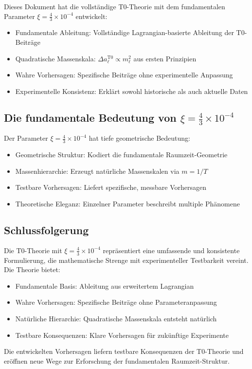\documentclass[12pt,a4paper]{article}
\begin{document}
	\begin{keyresult}
		Dieses Dokument hat die vollständige T0-Theorie mit dem fundamentalen Parameter $\xi = \frac{4}{3} \times 10^{-4}$ entwickelt:
		
		\begin{itemize}
			\item Fundamentale Ableitung: Vollständige Lagrangian-basierte Ableitung der T0-Beiträge
			\item Quadratische Massenskala: $\Delta a_\ell^{\mathrm{T0}} \propto m_\ell^2$ aus ersten Prinzipien
			\item Wahre Vorhersagen: Spezifische Beiträge ohne experimentelle Anpassung
			\item Experimentelle Konsistenz: Erklärt sowohl historische als auch aktuelle Daten
		\end{itemize}
	\end{keyresult}
	
	\subsection{Die fundamentale Bedeutung von $\xi = \frac{4}{3} \times 10^{-4}$}
	
	Der Parameter $\xi = \frac{4}{3} \times 10^{-4}$ hat tiefe geometrische Bedeutung:
	
	\begin{itemize}
		\item Geometrische Struktur: Kodiert die fundamentale Raumzeit-Geometrie
		\item Massenhierarchie: Erzeugt natürliche Massenskalen via $m = 1/T$
		\item Testbare Vorhersagen: Liefert spezifische, messbare Vorhersagen
		\item Theoretische Eleganz: Einzelner Parameter beschreibt multiple Phänomene
	\end{itemize}
	
	\subsection{Schlussfolgerung}
	
	\begin{keyresult}
		Die T0-Theorie mit $\xi = \frac{4}{3} \times 10^{-4}$ repräsentiert eine umfassende und konsistente Formulierung, die mathematische Strenge mit experimenteller Testbarkeit vereint. Die Theorie bietet:
		
		\begin{itemize}
			\item Fundamentale Basis: Ableitung aus erweitertem Lagrangian
			\item Wahre Vorhersagen: Spezifische Beiträge ohne Parameteranpassung
			\item Natürliche Hierarchie: Quadratische Massenskala entsteht natürlich
			\item Testbare Konsequenzen: Klare Vorhersagen für zukünftige Experimente
		\end{itemize}
		
		Die entwickelten Vorhersagen liefern testbare Konsequenzen der T0-Theorie und eröffnen neue Wege zur Erforschung der fundamentalen Raumzeit-Struktur.
	\end{keyresult}
	
\end{document}
